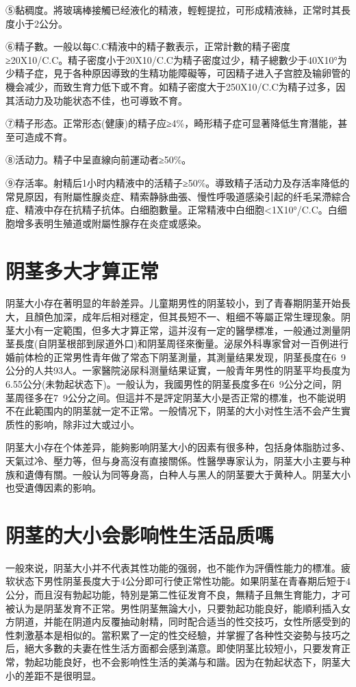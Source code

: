 \documentclass[12pt,UTF8]{ctexbook}
\begin{document}
⑤黏稠度。將玻璃棒接觸已经液化的精液，輕輕提拉，可形成精液絲，正常时其長度小于2公分。

⑥精子數。一般以每C.C精液中的精子數表示，正常計數的精子密度≥20X10/C.C。精子密度小于20X10/C.C为精子密度过少，精子總數少于40X10°为少精子症，見于各种原因導致的生精功能障礙等，可因精子进入子宫腔及输卵管的機会减少，而致生育力低下或不育。如精子密度大于250X10/C.C为精子过多，因其活动力及功能状态不佳，也可導致不育。

⑦精子形态。正常形态(健康)的精子应≥4\%，畸形精子症可显著降低生育潛能，甚至可造成不育。

⑧活动力。精子中呈直線向前運动者≥50\%。

⑨存活率。射精后1小时内精液中的活精子≥50\%。導致精子活动力及存活率降低的常見原因，有附屬性腺炎症、精索静脉曲張、慢性呼吸道感染引起的纤毛呆滯綜合症、精液中存在抗精子抗体。白细胞數量。正常精液中白细胞<1X10°/C.C。白细胞增多表明生殖道或附屬性腺存在炎症或感染。

\section{阴茎多大才算正常}

阴茎大小存在著明显的年龄差异。儿童期男性的阴茎较小，到了青春期阴茎开始長大，且顏色加深，成年后相对穩定，但其長短不一、粗细不等屬正常生理现象。阴茎大小有一定範围，但多大才算正常，這并沒有一定的醫學標准，一般通过測量阴茎長度(自阴茎根部到尿道外口)和阴茎周径來衡量。泌尿外科專家曾对一百例进行婚前体检的正常男性青年做了常态下阴茎測量，其測量结果发现，阴茎長度在6~9公分的人共93人。一家醫院泌尿科测量结果证實，一般青年男性的阴茎平均長度为6.55公分(未勃起状态下)。一般认为，我國男性的阴茎長度多在6~9公分之间，阴茎周径多在7~9公分之间。但這并不是評定阴茎大小是否正常的標准，也不能说明不在此範围内的阴茎就一定不正常。一般情况下，阴茎的大小对性生活不会产生實质性的影响，除非过大或过小。

阴茎大小存在个体差异，能夠影响阴茎大小的因素有很多种，包括身体脂肪过多、天氣过冷、壓力等，但与身高沒有直接關係。性醫學專家认为，阴茎大小主要与种族和遺傳有關。一般认为同等身高，白种人与黑人的阴茎要大于黄种人。阴茎大小也受遺傳因素的影响。

\section{阴茎的大小会影响性生活品质嗎}

一般來说，阴茎大小并不代表其性功能的强弱，也不能作为評價性能力的標准。疲软状态下男性阴茎長度大于4公分即可行使正常性功能。如果阴茎在青春期后短于4公分，而且沒有勃起功能，特別是第二性征发育不良，無精子且無生育能力，才可被认为是阴茎发育不正常。男性阴茎無論大小，只要勃起功能良好，能順利插入女方阴道，并能在阴道内反覆抽动射精，同时配合适当的性交技巧，女性所感受到的性刺激基本是相似的。當积累了一定的性交经驗，并掌握了各种性交姿勢与技巧之后，絕大多數的夫妻在性生活方面都会感到滿意。即使阴茎比较短小，只要发育正常，勃起功能良好，也不会影响性生活的美滿与和諧。因为在勃起状态下，阴茎大小的差距不是很明显。
\end{document}
